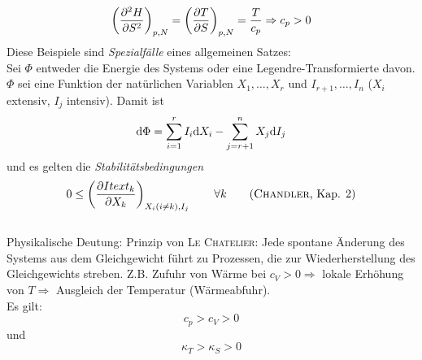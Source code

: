 \begin{equation}
    \left( \frac{\partial^2 H}{\partial S^2} \right)_{p, N} = \left( \frac{\partial T}{\partial S} \right)_{p, N} = \frac{T}{c_p} \Rightarrow c_p > 0
\end{equation}
Diese Beispiele sind \emph{Spezialfälle} eines allgemeinen Satzes: \\[\baselineskip]
Sei $\Phi$ entweder die Energie des Systems oder eine Legendre-Transformierte davon. $\Phi$ sei eine Funktion der natürlichen Variablen 
$X_1, \ldots, X_r$ und $I_{r+1}, \ldots, I_n$ ($X_i$ extensiv, $I_j$ intensiv). Damit ist
\begin{equation}
    \mathrm{d} \Phi = \sum_{i=1}^{r}  I_i \mathrm{d} X_i - \sum_{j=r+1}^{n} X_j \mathrm{d} I_j
\end{equation}
und es gelten die \emph{Stabilitätsbedingungen}
\begin{equation}
    0 \leq \left( \frac{\partial Itext_k}{\partial X_k} \right)_{X_i (i \neq k), I_j} \qquad \forall k \qquad \text{(\textsc{Chandler}, Kap. 2)}
\end{equation}\\
Physikalische Deutung: Prinzip von \textsc{Le Chatelier}: Jede spontane Änderung des Systems aus dem Gleichgewicht führt zu Prozessen, die zur 
Wiederherstellung des Gleichgewichts streben. Z.B. Zufuhr von Wärme bei $c_V > 0 \Rightarrow$ lokale Erhöhung von $T \Rightarrow $ 
Ausgleich der Temperatur (Wärmeabfuhr). \\[\baselineskip]
Es gilt:
\begin{equation}
    c_p > c_V > 0
\end{equation}
und
\begin{equation}
    \kappa_T > \kappa_S > 0
\end{equation}